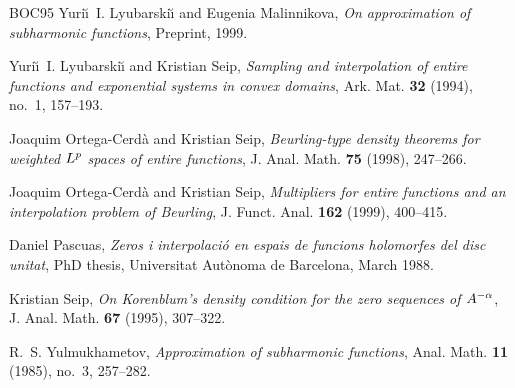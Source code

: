 \documentclass[12pt,twoside,final,psamsfonts]{amsart}
\theoremstyle{plain}
\theoremstyle{remark}
\theoremstyle{definition}
\begin{document}
\begin{thebibliography}{BOC95}
Yuri{\u\i}~I. Lyubarski{\u\i} and Eugenia Malinnikova, \emph{On approximation
  of subharmonic functions}, Preprint, 1999.

Yuri{\u\i}~I. Lyubarski{\u\i} and Kristian Seip, \emph{Sampling and
  interpolation of entire functions and exponential systems in convex domains},
  Ark. Mat. \textbf{32} (1994), no.~1, 157--193.

Joaquim Ortega-Cerd{\`a} and Kristian Seip, \emph{Beurling-type density
  theorems for weighted ${L}\sp p$ spaces of entire functions}, J. Anal. Math.
  \textbf{75} (1998), 247--266.

Joaquim Ortega-Cerd{\`a} and Kristian Seip, \emph{Multipliers for entire
  functions and an interpolation problem of {B}eurling}, J. Funct. Anal.
  \textbf{162} (1999), 400--415.

Daniel Pascuas, \emph{Zeros i interpolaci{\'o} en espais de funcions holomorfes
  del disc unitat}, Ph{D} thesis, Universitat Aut{\`o}noma de Barcelona, March
  1988.

Kristian Seip, \emph{On {K}orenblum's density condition for the zero sequences
  of ${A}\sp {-\alpha}$}, J. Anal. Math. \textbf{67} (1995), 307--322.

R.~S. Yulmukhametov, \emph{Approximation of subharmonic functions}, Anal. Math.
  \textbf{11} (1985), no.~3, 257--282.

\end{thebibliography}
\end{document}
